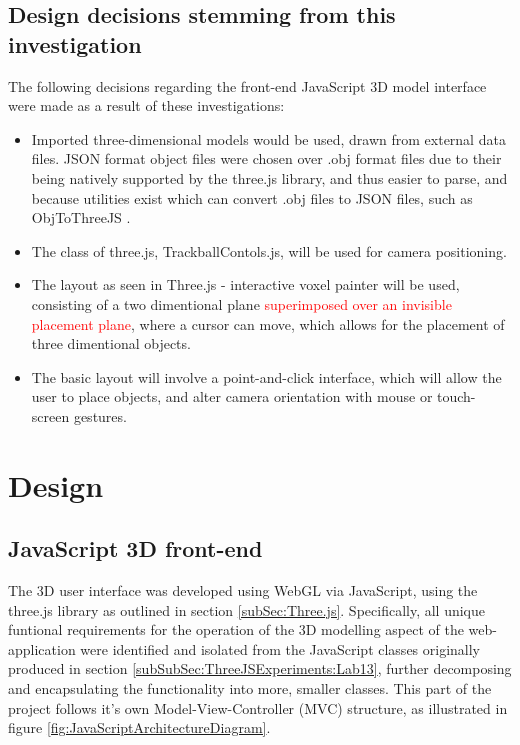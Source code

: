 \subsection{Design decisions stemming from this investigation}
\label{subSec: Three.js: Design decisions stemming from this investigation}

The following decisions regarding the front-end JavaScript 3D model interface were made as a result of these investigations:

\begin{itemize}
\item Imported three-dimensional models would be used, drawn from external data files. JSON format object files were chosen over .obj format files due to their being natively supported by the three.js library, and thus easier to parse, and because utilities exist which can convert .obj files to JSON files, such as Obj\textunderscore To\textunderscore ThreeJS \cite{ObjToJSON}.

\item The class of three.js, TrackballContols.js, will be used for camera positioning.

\item The layout as seen in Three.js - interactive voxel painter \cite{ThreeJSVoxelPainter} will be used, consisting of a two dimentional plane \textcolor{red}{superimposed over an invisible placement plane}, where a cursor can move, which allows for the placement of three dimentional objects.

\item The basic layout will involve a point-and-click interface, which will allow the user to place objects, and alter camera orientation with mouse or touch-screen gestures. 
\end{itemize}

\section{Design}
\label{sec:Design}

\subsection{JavaScript 3D front-end}

The 3D user interface was developed using WebGL via JavaScript, using the three.js library as outlined in section \ref{subSec:Three.js}. Specifically, all unique funtional requirements for the operation of the 3D modelling aspect of the web-application were identified and isolated from the JavaScript classes originally produced in section \ref{subSubSec:ThreeJSExperiments:Lab13}, further decomposing and encapsulating the functionality into more, smaller classes. This part of the project follows it's own Model-View-Controller (MVC) structure, as illustrated in figure \ref{fig:JavaScriptArchitectureDiagram}.

